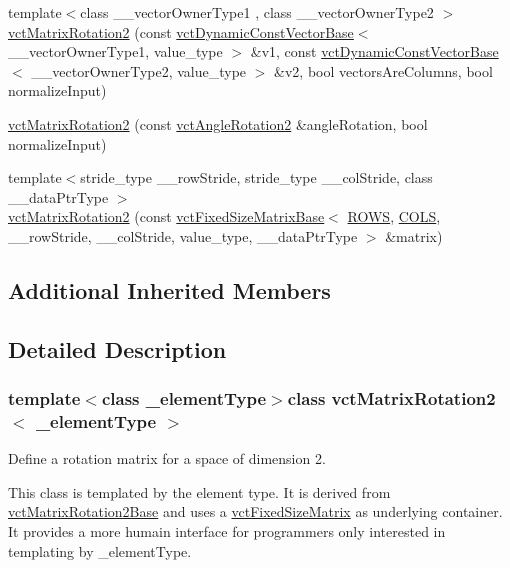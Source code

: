 \begin{DoxyCompactItemize}
\item 
{\footnotesize template$<$class \+\_\+\+\_\+vector\+Owner\+Type1 , class \+\_\+\+\_\+vector\+Owner\+Type2 $>$ }\\\hyperlink{classvct_matrix_rotation2_a51259e7423cae941178e9bb516182a63}{vct\+Matrix\+Rotation2} (const \hyperlink{classvct_dynamic_const_vector_base}{vct\+Dynamic\+Const\+Vector\+Base}$<$ \+\_\+\+\_\+vector\+Owner\+Type1, value\+\_\+type $>$ \&v1, const \hyperlink{classvct_dynamic_const_vector_base}{vct\+Dynamic\+Const\+Vector\+Base}$<$ \+\_\+\+\_\+vector\+Owner\+Type2, value\+\_\+type $>$ \&v2, bool vectors\+Are\+Columns, bool normalize\+Input)
\item 
\hyperlink{classvct_matrix_rotation2_aa174886e20cb79696ad4a41ca2b08748}{vct\+Matrix\+Rotation2} (const \hyperlink{classvct_angle_rotation2}{vct\+Angle\+Rotation2} \&angle\+Rotation, bool normalize\+Input)
\item 
{\footnotesize template$<$stride\+\_\+type \+\_\+\+\_\+row\+Stride, stride\+\_\+type \+\_\+\+\_\+col\+Stride, class \+\_\+\+\_\+data\+Ptr\+Type $>$ }\\\hyperlink{classvct_matrix_rotation2_a81ca92f57e9e2bd0a34722e9b3603e01}{vct\+Matrix\+Rotation2} (const \hyperlink{classvct_fixed_size_matrix_base}{vct\+Fixed\+Size\+Matrix\+Base}$<$ \hyperlink{group__cisst_vector_ggac2875a62bcfe1fb310808a4aff444120a405943de2af4c1dae37a90156248a41b}{R\+O\+W\+S}, \hyperlink{group__cisst_vector_ggac2875a62bcfe1fb310808a4aff444120a3f895b9e3be292e80920a74194301b11}{C\+O\+L\+S}, \+\_\+\+\_\+row\+Stride, \+\_\+\+\_\+col\+Stride, value\+\_\+type, \+\_\+\+\_\+data\+Ptr\+Type $>$ \&matrix)
\end{DoxyCompactItemize}
\subsection*{Additional Inherited Members}


\subsection{Detailed Description}
\subsubsection*{template$<$class \+\_\+element\+Type$>$class vct\+Matrix\+Rotation2$<$ \+\_\+element\+Type $>$}

Define a rotation matrix for a space of dimension 2. 

This class is templated by the element type. It is derived from \hyperlink{classvct_matrix_rotation2_base}{vct\+Matrix\+Rotation2\+Base} and uses a \hyperlink{classvct_fixed_size_matrix}{vct\+Fixed\+Size\+Matrix} as underlying container. It provides a more humain interface for programmers only interested in templating by \+\_\+element\+Type.


